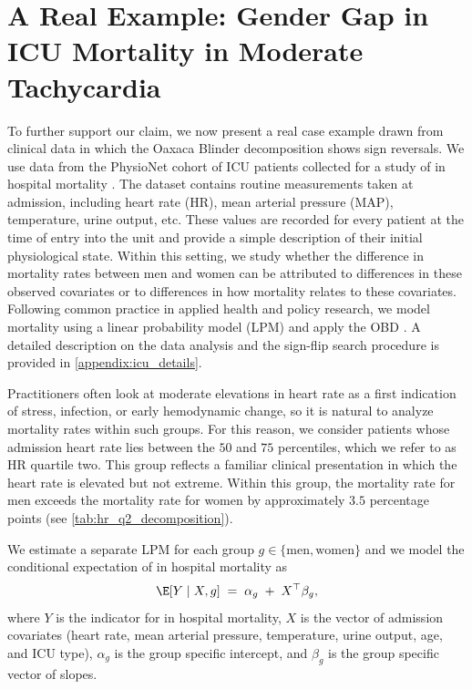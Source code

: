\section{A Real Example: Gender Gap in ICU Mortality in Moderate Tachycardia}
\label{sec:real_example}



To further support our claim, we now present a real case example drawn from clinical data in which the Oaxaca Blinder decomposition shows sign reversals. We use data from the PhysioNet cohort of ICU patients collected for a study of in hospital mortality \citep{goldberger2000physiobank}. The dataset contains routine measurements taken at admission, including heart rate (HR), mean arterial pressure (MAP), temperature, urine output, etc. These values are recorded for every patient at the time of entry into the unit and provide a simple description of their initial physiological state. Within this setting, we study whether the difference in mortality rates between men and women can be attributed to differences in these observed covariates or to differences in how mortality relates to these covariates. Following common practice in applied health and policy research, we model mortality using a linear probability model (LPM) and apply the OBD \citep{jann2008, edokaChangesCatastrophicHealth2017, sujin_LPM_OB, mweembaGapSelfRatedHealth2023}. A detailed description on the data analysis and the sign-flip search procedure is provided in \cref{appendix:icu_details}.

Practitioners often look at moderate elevations in heart rate as a first indication of stress, infection, or early hemodynamic change, so it is natural to analyze mortality rates within such groups. For this reason, we consider patients whose admission heart rate lies between the $50$ and $75$ percentiles, which we refer to as HR quartile two. This group reflects a familiar clinical presentation in which the heart rate is elevated but not extreme. Within this group, the mortality rate for men exceeds the mortality rate for women by approximately $3.5$ percentage points (see \cref{tab:hr_q2_decomposition}).

We estimate a separate LPM for each group $g \in \{\text{men}, \text{women}\}$ and we model the conditional expectation of in hospital mortality as
\[
    \E[Y \mid X, g] \;=\; \alpha_{g} \;+\; X^{\top}\beta_{g},
\]
where $Y$ is the indicator for in hospital mortality, $X$ is the vector of admission covariates (heart rate, mean arterial pressure, temperature, urine output, age, and ICU type), $\alpha_{g}$ is the group specific intercept, and $\beta_{g}$ is the group specific vector of slopes. 

